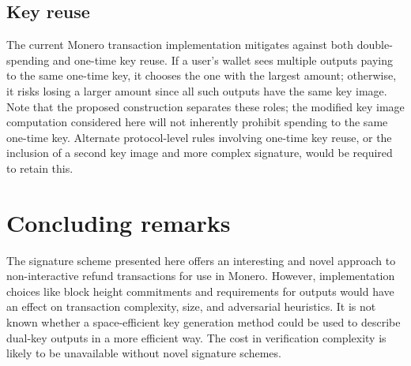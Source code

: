 \documentclass{mrl}
\begin{document}
\subsection{Key reuse}
The current Monero transaction implementation mitigates against both double-spending and one-time key reuse. If a user's wallet sees multiple outputs paying to the same one-time key, it chooses the one with the largest amount; otherwise, it risks losing a larger amount since all such outputs have the same key image. Note that the proposed construction separates these roles; the modified key image computation considered here will not inherently prohibit spending to the same one-time key. Alternate protocol-level rules involving one-time key reuse, or the inclusion of a second key image and more complex signature, would be required to retain this.

\section{Concluding remarks}
The signature scheme presented here offers an interesting and novel approach to non-interactive refund transactions for use in Monero. However, implementation choices like block height commitments and requirements for outputs would have an effect on transaction complexity, size, and adversarial heuristics. It is not known whether a space-efficient key generation method could be used to describe dual-key outputs in a more efficient way. The cost in verification complexity is likely to be unavailable without novel signature schemes.



\end{document}
